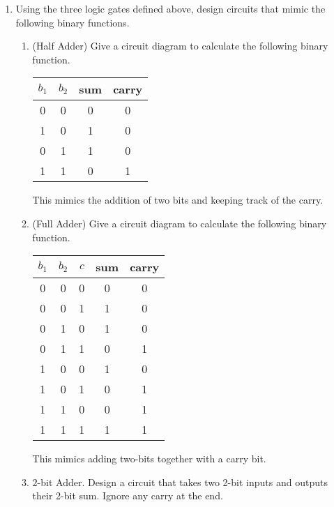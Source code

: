 \documentclass[11pt]{report}
\begin{document}
\begin{enumerate}	
	\item Using the three logic gates defined above, design circuits that mimic the following binary functions.
	
		\begin{enumerate}
			
			\item (Half Adder) Give a circuit diagram to calculate the following binary function.
				
				\begin{center}
					\begin{tabular}{c c || c c }
						$b_{1}$ & $b_{2}$ & sum & carry \\
						\hline
						0 & 0 & 0 & 0 \\
						1 & 0 & 1 & 0 \\
						0 & 1 & 1 & 0 \\
						1 & 1 & 0 & 1
						
					\end{tabular}
				\end{center}
		
				This mimics the addition of two bits and keeping track of the carry. 
		
			\item (Full Adder) Give a circuit diagram to calculate the following binary function.
				
				\begin{center}
					\begin{tabular}{c c c || c c }
						$b_{1}$ & $b_{2}$ & $c$ & sum & carry \\
						\hline
						0 & 0 & 0 & 0 & 0 \\
						0 & 0 & 1 & 1 & 0 \\
						0 & 1 & 0 & 1 & 0 \\
						0 & 1 & 1 & 0 & 1 \\
						1 & 0 & 0 & 1 & 0 \\
						1 & 0 & 1 & 0 & 1 \\
						1 & 1 & 0 & 0 & 1 \\
						1 & 1 & 1 & 1 & 1 
						
					\end{tabular}
				\end{center}
		
			This mimics adding two-bits together with a carry bit. 
		
			\item $2$-bit Adder. Design a circuit that takes two 2-bit inputs and outputs their 2-bit sum. Ignore any carry at the end.
			

\end{enumerate}
\end{enumerate}
\end{document}
